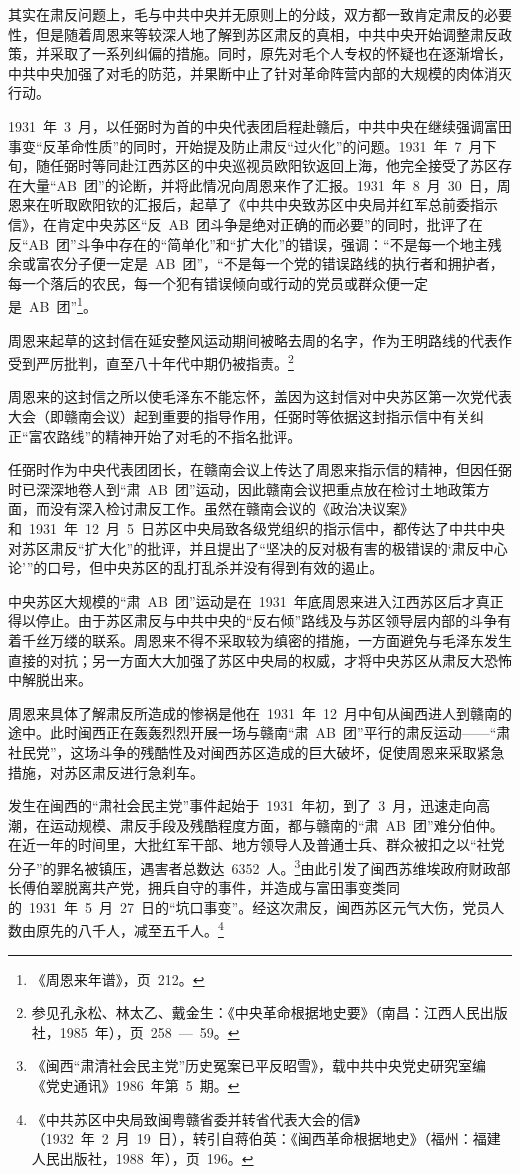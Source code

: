 其实在肃反问题上，毛与中共中央并无原则上的分歧，双方都一致肯定肃反的必要性，但是随着周恩来等较深人地了解到苏区肃反的真相，中共中央开始调整肃反政策，并采取了一系列纠偏的措施。同时，原先对毛个人专权的怀疑也在逐渐增长，中共中央加强了对毛的防范，并果断中止了针对革命阵营内部的大规模的肉体消灭行动。

1931~年~3~月，以任弼时为首的中央代表团启程赴赣后，中共中央在继续强调富田事变“反革命性质”的同时，开始提及防止肃反“过火化”的问题。1931~年~7~月下旬，随任弼时等同赴江西苏区的中央巡视员欧阳钦返回上海，他完全接受了苏区存在大量“AB~团”的论断，并将此情况向周恩来作了汇报。1931~年~8~月~30~日，周恩来在听取欧阳钦的汇报后，起草了《中共中央致苏区中央局并红军总前委指示信》，在肯定中央苏区“反~AB~团斗争是绝对正确的而必要”的同时，批评了在反“AB~团”斗争中存在的“简单化”和“扩大化”的错误，强调：“不是每一个地主残余或富农分子便一定是~AB~团”，“不是每一个党的错误路线的执行者和拥护者，每一个落后的农民，每一个犯有错误倾向或行动的党员或群众便一定是~AB~团”\footnote{《周恩来年谱》，页~212。}。

周恩来起草的这封信在延安整风运动期间被略去周的名字，作为王明路线的代表作受到严厉批判，直至八十年代中期仍被指责。\footnote{参见孔永松、林太乙、戴金生：《中央革命根据地史要》（南昌：江西人民出版社，1985~年），页~258~—~59。}

周恩来的这封信之所以使毛泽东不能忘怀，盖因为这封信对中央苏区第一次党代表大会（即赣南会议）起到重要的指导作用，任弼时等依据这封指示信中有关纠正“富农路线”的精神开始了对毛的不指名批评。

任弼时作为中央代表团团长，在赣南会议上传达了周恩来指示信的精神，但因任弼时已深深地卷人到“肃~AB~团”运动，因此赣南会议把重点放在检讨土地政策方面，而没有深入检讨肃反工作。虽然在赣南会议的《政治决议案》和~1931~年~12~月~5~日苏区中央局致各级党组织的指示信中，都传达了中共中央对苏区肃反“扩大化”的批评，并且提出了“坚决的反对极有害的极错误的‘肃反中心论’”的口号，但中央苏区的乱打乱杀并没有得到有效的遏止。

中央苏区大规模的“肃~AB~团”运动是在~1931~年底周恩来进入江西苏区后才真正得以停止。由于苏区肃反与中共中央的“反右倾”路线及与苏区领导层内部的斗争有着千丝万缕的联系。周恩来不得不采取较为缜密的措施，一方面避免与毛泽东发生直接的对抗；另一方面大大加强了苏区中央局的权威，才将中央苏区从肃反大恐怖中解脱出来。

周恩来具体了解肃反所造成的惨祸是他在~1931~年~12~月中旬从闽西进人到赣南的途中。此时闽西正在轰轰烈烈开展一场与赣南“肃~AB~团”平行的肃反运动——“肃社民党”，这场斗争的残酷性及对闽西苏区造成的巨大破坏，促使周恩来采取紧急措施，对苏区肃反进行急刹车。

发生在闽西的“肃社会民主党”事件起始于~1931~年初，到了~3~月，迅速走向高潮，在运动规模、肃反手段及残酷程度方面，都与赣南的“肃~AB~团”难分伯仲。在近一年的时间里，大批红军干部、地方领导人及普通士兵、群众被扣之以“社党分子”的罪名被镇压，遇害者总数达~6352~人。\footnote{《闽西“肃清社会民主党”历史冤案已平反昭雪》，载中共中央党史研究室编《党史通讯》1986~年第~5~期。}由此引发了闽西苏维埃政府财政部长傅伯翠脱离共产党，拥兵自守的事件，并造成与富田事变类同的~1931~年~5~月~27~日的“坑口事变”。经这次肃反，闽西苏区元气大伤，党员人数由原先的八千人，减至五千人。\footnote{《中共苏区中央局致闽粤赣省委并转省代表大会的信》（1932~年~2~月~19~日），转引自蒋伯英：《闽西革命根据地史》（福州：福建人民出版社，1988~年），页~196。}

